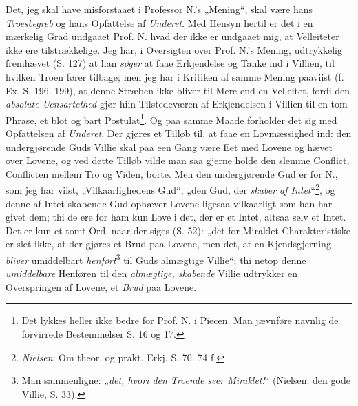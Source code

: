 \documentclass[12pt,a4paper]{book}
\newcommand{\opage}[1]{\marginnote{\footnotesize\textit{[#1]}}}
\begin{document}
Det, jeg skal have misforstaaet i Professor N.'s „Mening“, skal være hans
\emph{Troesbegreb} og hans Opfattelse af \emph{Underet}. Med Hensyn hertil er
det i en mærkelig Grad undgaaet Prof. N. hvad der ikke er undgaaet mig, at
Velleiteter ikke ere tilstrækkelige. Jeg har, i Oversigten over Prof. N.'s
Mening, udtrykkelig fremhævet (S. 127) at han \emph{søger} at faae Erkjendelse
og Tanke ind i Villien, til hvilken Troen fører tilbage; men jeg har i Kritiken
af samme Mening paaviist (f. Ex. S. 196. 199), at denne Stræben ikke bliver til
Mere end en Velleitet, fordi den \emph{absolute Uensartethed} gjør hiin
Tilstedeværen af Erkjendelsen i Villien til en tom Phrase, et blot og bart
Postulat\footnote{%
  Det lykkes heller ikke bedre for Prof. N. i Piecen. Man jævnføre navnlig de
  forvirrede Bestemmelser S. 16 og 17.}.
Og paa samme Maade forholder det sig med Opfattelsen af \emph{Underet}. Der
gjøres et Tilløb til, at faae en Lovmæssighed ind: den undergjørende Guds Villie
skal paa een Gang være Eet med Lovene og hævet over Lovene, og ved dette Tilløb
vilde man saa gjerne holde den slemme Conflict, Conflicten mellem Tro og Viden,
borte. Men den undergjørende Gud er for N., som jeg har viist,
„Vilkaarlighedens Gud“, „den Gud, der \emph{skaber af Intet}“\footnote{%
  \emph{Nielsen}: Om theor. og prakt. Erkj. S. 70. 74 f.}, og denne af Intet
skabende Gud ophæver Lovene ligesaa vilkaarligt som han har givet dem; thi de
ere for ham kun Love i det, der er et Intet, altsaa selv et Intet.
Det er kun et tomt Ord, naar der siges (S. 52): „det for Miraklet
Charakteristiske er slet ikke, at der gjøres et Brud paa Lovene, men det, at en
Kjendsgjerning \emph{bliver} umiddelbart \emph{henført}\footnote{%
  Man sammenligne: „\emph{det, hvori den Troende seer Miraklet!}“ (Nielsen: den
  gode Villie, S. 33).} til Guds almægtige
\opage{7} Villie“; thi netop denne \emph{umiddelbare} Henføren til den \emph{almægtige,
skabende} Villie udtrykker en Overspringen af Lovene, et \emph{Brud} paa Lovene.
\end{document}
